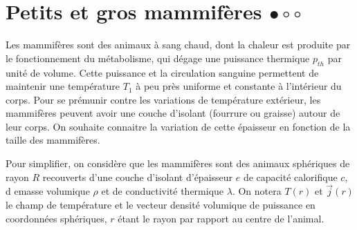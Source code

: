 \documentclass{report}
\begin{document}
\section*{Petits et gros mammifères $\bullet\circ\circ$}

Les mammifères sont des animaux à sang chaud, dont la chaleur est produite par le fonctionnement du métabolisme, qui dégage une puissance thermique $p_{th}$ par unité de volume. Cette puissance et la circulation sanguine permettent de maintenir une température $T_1$ à peu près uniforme et constante à l'intérieur du corps. Pour se prémunir contre les variations de température extérieur, les mammifères peuvent avoir une couche d'isolant (fourrure ou graisse) autour de leur corps. On souhaite connaitre la variation de cette épaisseur en fonction de la taille des mammifères. 

Pour simplifier, on considère que les mammifères sont des animaux sphériques de rayon $R$ recouverts d'une couche d'isolant d'épaisseur $e$ de capacité calorifique $c$, d emasse volumique $\rho$ et de conductivité thermique $\lambda$. On notera $T(r)$ et $\vec{j}(r)$ le champ de température et le vecteur densité volumique de puissance en coordonnées sphériques, $r$ étant le rayon par rapport au centre de l'animal.
\end{document}
